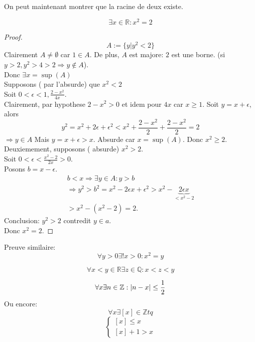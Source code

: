 \documentclass[../main.tex]{subfiles}
\begin{document}
On peut maintenant montrer que la racine de deux existe.
\begin{thm}\label{thm:la_racine_de_deux_existe}
	\[ 
	\exists x \in \mathbb{R}: x^{2}=2
	\]
	
\end{thm}
\begin{proof}
\[ 
	A := \{ y \vert y^{2} < 2 \}
\]
Clairement $A \neq \emptyset$ car $1 \in A$. De plus, $A$ est majore:
$2$ est une borne. (si $y>2, y^{2}>4>2 \Rightarrow y \notin A$).\\
Donc $\exists x = \sup ( A)$\\
Supposons ( par l'absurde) que $x^{2}<2$ \\
Soit $0 < \epsilon < 1, \frac{2-x^{2}}{4x}$.\\
Clairement, par hypothese $2-x^{2} > 0$ et idem pour $4x$ car $x \geq 1$.
Soit $y=x+\epsilon$, alors
\[ 
y^{2} = x^{2} + 2\epsilon + \epsilon^{2} < x^{2} + \frac{2-x^{2}}{2} + \frac{2-x^{2}}{2} = 2
\]
$\Rightarrow y \in A$  Mais $y= x + \epsilon > x$.
Absurde car $x= \sup ( A)$.
Donc $x^{2}\geq 2$.
Deuxiemement, supposons ( absurde) $x^{2}>2$.\\
Soit $0 < \epsilon < \frac{x^{2}-2}{2x}>0$.\\
Posons $b= x - \epsilon$.
\begin{align*}
b < x \Rightarrow \exists y \in A: y>b\\
\Rightarrow y^{2} > b^{2} = x^{2}-2 \epsilon x + \epsilon ^{2} > x^{2} - \underbrace{ 2\epsilon x }_{< x^{2} -2}\\
> x^{2} - ( x^{2}-2) = 2.
\end{align*}
Conclusion: $y^{2}>2$ contredit $y \in a$.\\
Donc $x^{2}=2$.
\end{proof}
\begin{rmq}
Preuve similaire:\\
 \[ 
\forall y > 0 \exists ! x>0: x^{2}=y
\]

\end{rmq}
\begin{propo}\label{propo:_mathbb_q_est_dense_dans_mathbb_r_}
	\[ 
	\forall x < y \in \mathbb{R} \exists z \in \mathbb{Q}: x <z<y
	\]
	
\end{propo}
\begin{lemma}
\[ 
	\forall x \exists n \in \mathbb{Z}: \left\vert n-x\right\vert \leq \frac{1}{2}
\]
Ou encore:
\[ 
\forall x \exists [ x] \in \mathbb{Z} tq
\]
\[ 
\begin{cases}
[ x] \leq x\\
[ x] +1 > x
\end{cases}
\]
\end{lemma}
\end{document}
